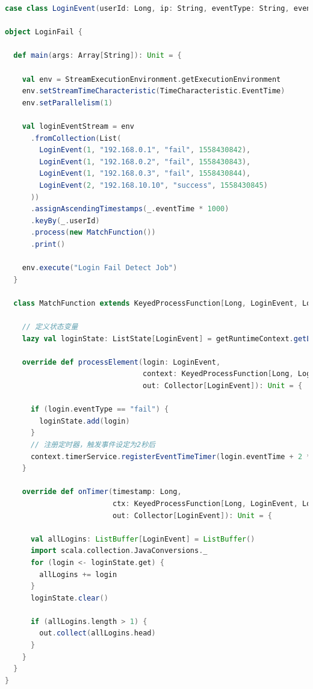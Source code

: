 \documentclass[oneside]{ctexbook}
\begin{document}
\begin{lstlisting}[language=scala]
case class LoginEvent(userId: Long, ip: String, eventType: String, eventTime: Long)

object LoginFail {

  def main(args: Array[String]): Unit = {

    val env = StreamExecutionEnvironment.getExecutionEnvironment
    env.setStreamTimeCharacteristic(TimeCharacteristic.EventTime)
    env.setParallelism(1)

    val loginEventStream = env
      .fromCollection(List(
        LoginEvent(1, "192.168.0.1", "fail", 1558430842),
        LoginEvent(1, "192.168.0.2", "fail", 1558430843),
        LoginEvent(1, "192.168.0.3", "fail", 1558430844),
        LoginEvent(2, "192.168.10.10", "success", 1558430845)
      ))
      .assignAscendingTimestamps(_.eventTime * 1000)
      .keyBy(_.userId)
      .process(new MatchFunction())
      .print()

    env.execute("Login Fail Detect Job")
  }

  class MatchFunction extends KeyedProcessFunction[Long, LoginEvent, LoginEvent] {

    // 定义状态变量
    lazy val loginState: ListState[LoginEvent] = getRuntimeContext.getListState(new ListStateDescriptor[LoginEvent]("saved login", classOf[LoginEvent]))

    override def processElement(login: LoginEvent,
                                context: KeyedProcessFunction[Long, LoginEvent, LoginEvent]#Context,
                                out: Collector[LoginEvent]): Unit = {

      if (login.eventType == "fail") {
        loginState.add(login)
      }
      // 注册定时器，触发事件设定为2秒后
      context.timerService.registerEventTimeTimer(login.eventTime + 2 * 1000)
    }

    override def onTimer(timestamp: Long,
                         ctx: KeyedProcessFunction[Long, LoginEvent, LoginEvent]#OnTimerContext,
                         out: Collector[LoginEvent]): Unit = {

      val allLogins: ListBuffer[LoginEvent] = ListBuffer()
      import scala.collection.JavaConversions._
      for (login <- loginState.get) {
        allLogins += login
      }
      loginState.clear()

      if (allLogins.length > 1) {
        out.collect(allLogins.head)
      }
    }
  }
}
\end{lstlisting}
\end{document}
